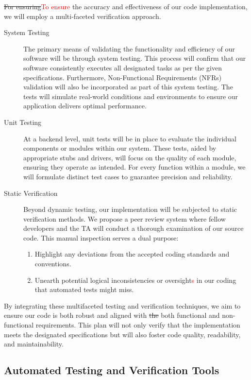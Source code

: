 \documentclass[12pt, titlepage]{article}
\newcommand{\rt}[1]{\textcolor{red}{#1}}
\begin{document}
\sout{For ensuring}\rt{To ensure} the accuracy and effectiveness of our code implementation, we will
employ a multi-faceted verification approach.
\begin{description}
\item[System Testing] The primary means of validating the functionality and
  efficiency of our software will be through system testing. This process will
  confirm that our software consistently executes all designated tasks as per
  the given specifications. Furthermore, Non-Functional Requirements (NFRs)
  validation will also be incorporated as part of this system testing. The tests
  will simulate real-world conditions and environments to ensure our application
  delivers optimal performance.
\item[Unit Testing] At a backend level, unit tests will be in place to evaluate
  the individual components or modules within our system. These tests, aided by
  appropriate stubs and drivers, will focus on the quality of each module,
  ensuring they operate as intended. For every function within a module, we will
  formulate distinct test cases to guarantee precision and reliability.
\item[Static Verification] Beyond dynamic testing, our implementation will be
  subjected to static verification methods. We propose a peer review system
  where fellow developers and the TA will conduct a thorough examination of our
  source code. This manual inspection serves a dual purpose:
  \begin{enumerate}
  \item Highlight any deviations from the accepted coding standards and
    conventions.
  \item Unearth potential logical inconsistencies or oversight\rt{s} in our
    coding that automated tests might miss.
  \end{enumerate}
\end{description}
By integrating these multifaceted testing and verification techniques, we aim to
ensure our code is both robust and aligned with \sout{the} both functional and
non-functional requirements. This plan will not only verify that the
implementation meets the designated specifications but will also foster code
quality, readability, and maintainability.

\subsection{Automated Testing and Verification Tools}
\end{document}
